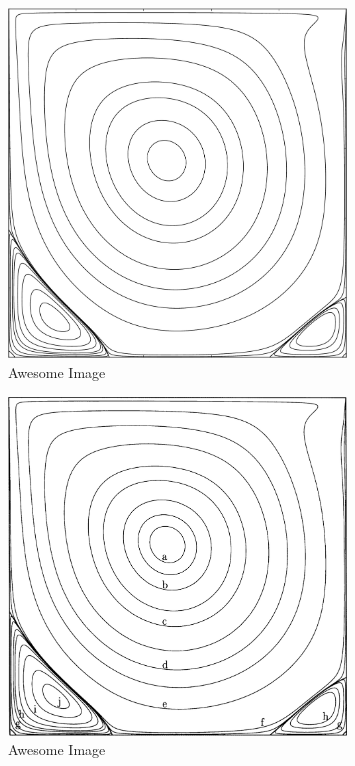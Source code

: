 \begin{figure}[p]
    \centering
    \includegraphics[width=0.8\textwidth]{Images/streamFunction.pdf}
    \caption{Awesome Image}
    \label{fig:awesome_image}
\end{figure}

\begin{figure}[p]
    \centering
    \includegraphics[width=0.8\textwidth]{Images/streamFunction.png}
    \caption{Awesome Image}
    \label{fig:awesome_image}
\end{figure}

